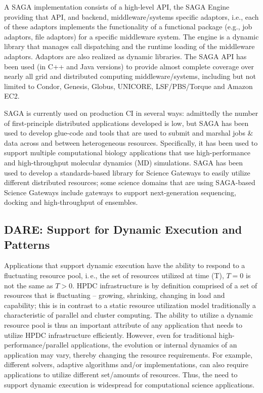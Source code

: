 \documentclass[]{svjour3}
\begin{document}
A SAGA implementation consists of a high-level API, the SAGA
Engine providing that API, and backend, middleware/systems specific
adaptors, i.e., each of these adaptors implements the functionality of
a functional package (e.g., job adaptors, file adaptors) for a
specific middleware system. The engine is a dynamic library that
manages call dispatching and the runtime loading of the middleware
adaptors. Adaptors are also realized as dynamic libraries. The SAGA
API has been used (in C++ and Java versions) to provide almost
complete coverage over nearly all grid and distributed computing
middleware/systems, including but not limited to Condor, Genesis,
Globus, UNICORE, LSF/PBS/Torque and Amazon EC2.

SAGA is currently used on production CI in several ways: admittedly
the number of first-principle distributed applications developed is
low, but SAGA has been used to develop glue-code and tools that are
used to submit and marshal jobs \& data across and between
heterogeneous resources. Specifically, it has been used to support
multiple computational biology applications that use high-performance
and high-throughput molecular dynamics (MD) simulations. SAGA has been
used to develop a standards-based library for Science Gateways to
easily utilize different distributed resources; some science domains
that are using SAGA-based Science Gateways include gateways to support
next-generation sequencing, docking and high-throughput of ensembles.

\subsection{DARE: Support for Dynamic Execution and Patterns}



Applications that support dynamic execution have the ability to
respond to a fluctuating resource pool, i.\,e., the set of resources
utilized at time (T), $T=0$ is not the same as $T>0$. HPDC
infrastructure is by definition comprised of a set of resources that
is fluctuating -- growing, shrinking, changing in load and capability;
this is in contrast to a static resource utilization model
traditionally a characteristic of parallel and cluster computing.  The
ability to utilize a dynamic resource pool is thus an important
attribute of any application that needs to utilize HPDC infrastructure
efficiently.  However, even for traditional high-performance/parallel
applications, the evolution or internal dynamics of an application may
vary, thereby changing the resource requirements.  For example,
different solvers, adaptive algorithms and/or implementations, can
also require applications to utilize different set/amounts of
resources.  Thus, the need to support dynamic execution is widespread
for computational science applications.
\end{document}
